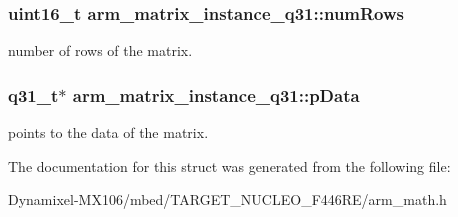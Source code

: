 \subsubsection[{\texorpdfstring{num\+Rows}{numRows}}]{\setlength{\rightskip}{0pt plus 5cm}uint16\+\_\+t arm\+\_\+matrix\+\_\+instance\+\_\+q31\+::num\+Rows}\hypertarget{structarm__matrix__instance__q31_a63bacac158a821c8cfc06088d251598c}{}\label{structarm__matrix__instance__q31_a63bacac158a821c8cfc06088d251598c}
number of rows of the matrix. 
\subsubsection[{\texorpdfstring{p\+Data}{pData}}]{\setlength{\rightskip}{0pt plus 5cm}q31\+\_\+t$\ast$ arm\+\_\+matrix\+\_\+instance\+\_\+q31\+::p\+Data}\hypertarget{structarm__matrix__instance__q31_a09a64267c0579fef086efc9059741e56}{}\label{structarm__matrix__instance__q31_a09a64267c0579fef086efc9059741e56}
points to the data of the matrix. 

The documentation for this struct was generated from the following file\+:\begin{DoxyCompactItemize}
\item 
Dynamixel-\/\+M\+X106/mbed/\+T\+A\+R\+G\+E\+T\+\_\+\+N\+U\+C\+L\+E\+O\+\_\+\+F446\+R\+E/arm\+\_\+math.\+h\end{DoxyCompactItemize}
